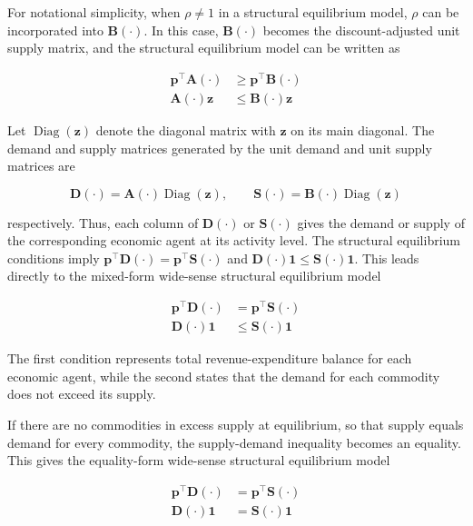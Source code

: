 \documentclass[
  letterpaper,
  DIV=11,
  numbers=noendperiod]{scrreprt}
\begin{document}
For notational simplicity, when \(\rho\neq1\) in a structural
equilibrium model, \(\rho\) can be incorporated into
\(\mathbf B(\cdot)\). In this case, \(\mathbf B(\cdot)\) becomes the
discount-adjusted unit supply matrix, and the structural equilibrium
model can be written as

\[
\begin{aligned}
\mathbf p^{\top}\mathbf A(\cdot)
&\geq
\mathbf p^{\top}\mathbf B(\cdot)\\
\mathbf A(\cdot)\mathbf z
&\leq
\mathbf B(\cdot)\mathbf z
\end{aligned}
\]

Let \(\operatorname{Diag}(\mathbf z)\) denote the diagonal matrix with
\(\mathbf z\) on its main diagonal. The demand and supply matrices
generated by the unit demand and unit supply matrices are

\[
\mathbf D(\cdot)=\mathbf A(\cdot)\operatorname{Diag}(\mathbf z),
\qquad
\mathbf S(\cdot)=\mathbf B(\cdot)\operatorname{Diag}(\mathbf z)
\]

respectively. Thus, each column of \(\mathbf D(\cdot)\) or
\(\mathbf S(\cdot)\) gives the demand or supply of the corresponding
economic agent at its activity level. The structural equilibrium
conditions imply
\(\mathbf p^{\top}\mathbf D(\cdot)=\mathbf p^{\top}\mathbf S(\cdot)\)
and \(\mathbf D(\cdot)\mathbf 1\leq\mathbf S(\cdot)\mathbf 1\). This
leads directly to the mixed-form wide-sense structural equilibrium model

\[
\begin{aligned}
\mathbf p^{\top}\mathbf D(\cdot)
&=
\mathbf p^{\top}\mathbf S(\cdot)\\
\mathbf D(\cdot)\mathbf 1
&\leq
\mathbf S(\cdot)\mathbf 1
\end{aligned}
\]

The first condition represents total revenue-expenditure balance for
each economic agent, while the second states that the demand for each
commodity does not exceed its supply.

If there are no commodities in excess supply at equilibrium, so that
supply equals demand for every commodity, the supply-demand inequality
becomes an equality. This gives the equality-form wide-sense structural
equilibrium model

\[
\begin{aligned}
\mathbf p^{\top}\mathbf D(\cdot)
&=
\mathbf p^{\top}\mathbf S(\cdot)\\
\mathbf D(\cdot)\mathbf 1
&=
\mathbf S(\cdot)\mathbf 1
\end{aligned}
\]
\end{document}
